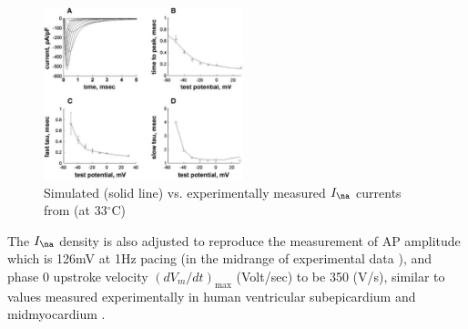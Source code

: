 \begin{figure}[htb]
  \centerline{\includegraphics[height=5cm]{./images/Iyer2004_Ina.eps}}
  \caption{Simulated (solid line) vs. experimentally measured $I_\na$ currents
  from \citep{nagatomo1998, wang2000} (at 33$^\circ$C)}\label{fig:Iyer2004_Ina}
\end{figure}
 
The $I_\na$ density is also adjusted to reproduce the measurement of AP
amplitude which is 126mV at 1Hz pacing (in the midrange of experimental data
\citep{li1998, nabauer1996}), and phase 0 upstroke velocity $(dV_m/dt)_\max$
(Volt/sec) to be 350 (V/s), similar to values measured experimentally in human
ventricular subepicardium and midmyocardium \citep{drouin1995, pereon2000}.













